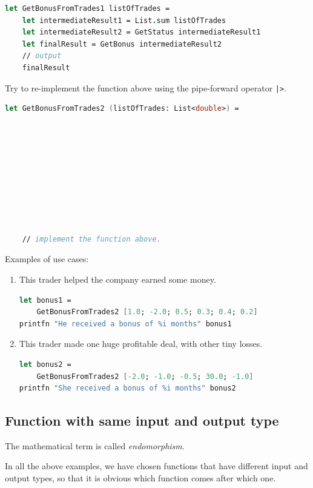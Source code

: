 \documentclass[12pt]{article}
\begin{document}
\begin{lstlisting}[language=FSharp]
let GetBonusFromTrades1 listOfTrades =
    let intermediateResult1 = List.sum listOfTrades
    let intermediateResult2 = GetStatus intermediateResult1
    let finalResult = GetBonus intermediateResult2
    // output
    finalResult
\end{lstlisting}

Try to re-implement the function above using the pipe-forward operator \texttt{|>}.
\begin{lstlisting}[language=FSharp]
let GetBonusFromTrades2 (listOfTrades: List<double>) =










    // implement the function above.
\end{lstlisting}

\vspace{1.0cm}

Examples of use cases:
\begin{enumerate}
\item This trader helped the company earned some money. 
\begin{lstlisting}[language=FSharp]
let bonus1 = 
    GetBonusFromTrades2 [1.0; -2.0; 0.5; 0.3; 0.4; 0.2]
printfn "He received a bonus of %i months" bonus1
\end{lstlisting}
\item This trader made one huge profitable deal, with other tiny losses.

\begin{lstlisting}[language=FSharp]
let bonus2 = 
    GetBonusFromTrades2 [-2.0; -1.0; -0.5; 30.0; -1.0]
printfn "She received a bonus of %i months" bonus2
\end{lstlisting}
\end{enumerate}

\subsection{Function with same input and output type}
The mathematical term is called \textit{endomorphism}. 

In all the above examples, we have chosen functions that have different input and output types, so that it is obvious which function comes after which one.
\end{document}
